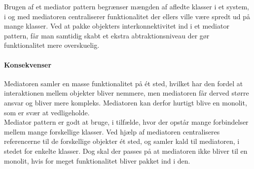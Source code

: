 Brugen af et mediator pattern begrænser mængden af afledte klasser i et system, i og med mediatoren centraliserer funktionalitet der ellers ville være spredt ud på mange klasser. Ved at pakke objekters interkonnektivitet ind i et mediator pattern, får man samtidig skabt et ekstra abtraktionsniveau der gør funktionalitet mere overskuelig.

\paragraph{Konsekvenser}
Mediatoren samler en masse funktionalitet på ét sted, hvilket har den fordel at interaktionen mellem objekter bliver nemmere, men mediatoren får derved større ansvar og bliver mere kompleks. Mediatoren kan derfor hurtigt blive en monolit, som er svær at vedligeholde.\\

Mediator pattern er godt at bruge, i tilfælde, hvor der opstår mange forbindelser mellem mange forskellige klasser. Ved hjælp af mediatoren centraliseres referencerne til de forskellige objekter ét sted, og samler kald til mediatoren, i stedet for enkelte klasser. Dog skal der passes på at mediatoren ikke bliver til en monolit, hvis for meget funktionalitet bliver pakket ind i den.

